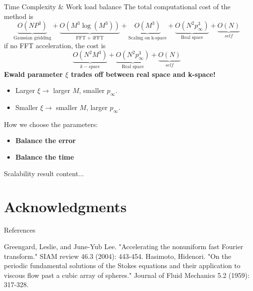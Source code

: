 \documentclass{beamer}
\begin{document}
\begin{frame}{Time Complexity \& Work load balance}
The total computational cost of the method is
\begin{equation}
\underbrace{O(NP^3)}_{\text{Gaussian gridding}} + \underbrace{O(M^3 \log(M^3))}_{\text{FFT + iFFT}} + \underbrace{O(M^3)}_{\text{Scaling on k-space}} + \underbrace{O(N^2 p_{\infty}^3)}_{\text{Real space}} + \underbrace{O(N)}_{self}
\end{equation}
if no FFT acceleration, the cost is
\begin{equation}
\underbrace{O(N^2M^3)}_{k-space} + \underbrace{O(N^2 p_{\infty}^3)}_{\text{Real space}} + \underbrace{O(N)}_{self}
\end{equation}
\textbf{Ewald parameter $\xi$ trades off between real space and k-space!}
\begin{itemize}
	\item Larger $\xi \rightarrow$ larger $M$, smaller $p_{\infty}$.
	\item Smaller $\xi \rightarrow$ smaller $M$, larger $p_{\infty}$.
\end{itemize}
How we choose the parameters:
\begin{itemize}
	\item \textbf{Balance the error} \\
	\item \textbf{Balance the time}
\end{itemize}
\end{frame}

\begin{frame}{Scalability result}
content...
\end{frame}
\section{Acknowledgments}

\begin{frame}{References}
	\begin{thebibliography}{0}
		Greengard, Leslie, and June-Yub Lee. "Accelerating the nonuniform fast Fourier transform." SIAM review 46.3 (2004): 443-454.
		Hasimoto, Hidenori. "On the periodic fundamental solutions of the Stokes equations and their application to viscous flow past a cubic array of spheres." Journal of Fluid Mechanics 5.2 (1959): 317-328.
	\end{thebibliography}
\end{frame}
\end{document}
